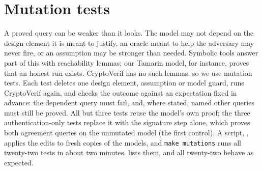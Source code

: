 \section{Mutation tests}\label{sec:mutations}

A proved query can be weaker than it looks. The model may not depend on the
design element it is meant to justify, an oracle meant to help the adversary
may never fire, or an assumption may be stronger than needed. Symbolic tools
answer part of this with reachability lemmas; our Tamarin model, for
instance, proves that an honest run exists. CryptoVerif has no such lemmas,
so we use mutation tests. Each test deletes one design element, assumption
or model guard, runs CryptoVerif again, and checks the outcome against an
expectation fixed in advance: the dependent query must fail, and, where
stated, named other queries must still be proved. All but three tests reuse
the model's own proof; the three authentication-only tests replace it with
the signature step alone, which proves both agreement queries on the
unmutated model (the first control). A script, , applies
the edits to fresh copies of the models, and \texttt{make mutations} runs all
twenty-two tests in about two minutes.  lists them, and
all twenty-two behave as expected.

